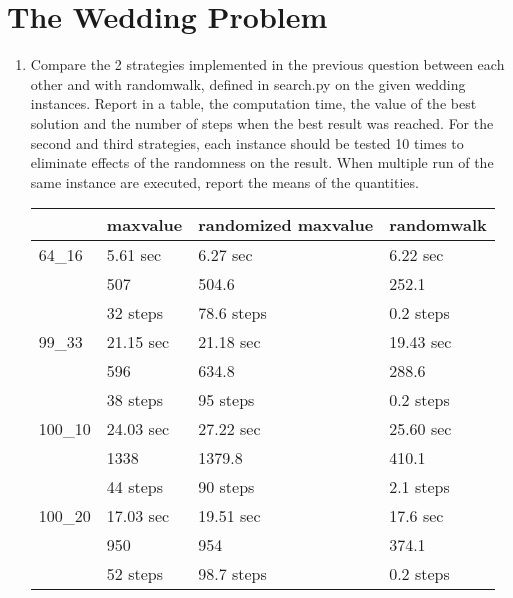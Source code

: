 \section{The Wedding Problem}
\begin{enumerate}
    \item Compare the 2 strategies implemented in the previous question between
    each other and with randomwalk, defined in search.py on the given wedding
    instances. Report in a table, the computation time, the value of the best
    solution and the number of steps when the best result was reached. For the
    second and third strategies, each instance should be tested 10 times to
    eliminate effects of the randomness on the result. When multiple run of the
    same instance are executed, report the means of the quantities.
    \begin{framed}
    	\begin{tabular}{l|l|l|l}
    					& maxvalue 		& randomized maxvalue	& randomwalk\\
            \hline
    		64\_16	 	& 5.61 sec		& 6.27 sec		& 6.22 sec\\
    					& 507			& 504.6			& 252.1\\
    					& 32 steps		& 78.6 steps	& 0.2 steps\\
    		99\_33	 	& 21.15 sec		& 21.18 sec		& 19.43 sec\\
    					& 596	 		& 634.8 		& 288.6\\
    					& 38 steps		& 95 steps		& 0.2 steps\\
    		100\_10	 	& 24.03 sec		& 27.22 sec 	& 25.60 sec\\
    					& 1338			& 1379.8		& 410.1\\
    					& 44 steps		& 90 steps		& 2.1 steps\\
    		100\_20	 	& 17.03 sec		& 19.51 sec 	& 17.6 sec\\
    					& 950 			& 954 			& 374.1\\
    					& 52 steps		& 98.7 steps 	& 0.2 steps\\
    	\end{tabular}
    \end{framed}


\end{enumerate}
